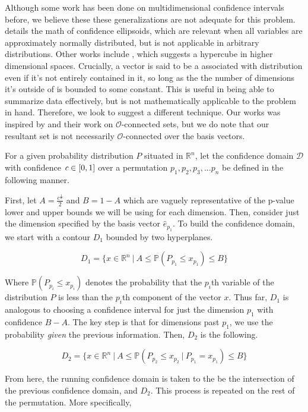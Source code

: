 \documentclass{article}
\begin{document}
    Although some work has been done on multidimensional confidence intervals before, we believe these these generalizations are not adequate for this problem. \cite{MELOUN2011667} details the math of confidence ellipsoids, which are relevant when all variables are approximately normally distributed, but is not applicable in arbitrary distributions. Other works include \cite{korpela2017multivariate}, which suggests a hypercube in higher dimensional spaces. Crucially, a vector is said to be a associated with distribution even if it's not entirely contained in it, so long as the the number of dimensions it's outside of is bounded to some constant. This is useful in being able to summarize data effectively, but is not mathematically applicable to the problem in hand. Therefore, we look to suggest a different technique. Our works was inspired by \cite{FINK1996175} and their work on $\mathcal{O}$-connected sets, but we do note that our resultant set is not necessarily $\mathcal{O}$-connected over the basis vectors.

    For a given probability distribution $P$ situated in $\mathbb{R}^n$, let the confidence domain $\mathcal{D}$ with confidence $\emph{c} \in [0,1]$ over a permutation $p_1, p_2, p_3, ... p_n$ be defined in the following manner.

    First, let $A = \frac{c ^ {\frac{1}{n}}}{2}$ and $B = 1 - A$ which are vaguely representative of the p-value lower and upper bounds we will be using for each dimension. Then, consider just the dimension specified by the basis vector $\hat{e}_{p_1}$. To build the confidence domain, we start with a contour $D_1$ bounded by two hyperplanes.

    $$D_1 = \{ x \in \mathbb{R}^n ~|~ A \le \mathbb{P}(P_{p_1} \le x_{p_1}) \le B\}$$

    Where $\mathbb{P}(P_{p_i} \le x_{p_i})$ denotes the probability that the $p_i$th variable of the distribution $P$ is less than the $p_i$th component of the vector $x$. Thus far, $D_1$ is analogous to choosing a confidence interval for just the dimension $p_1$ with confidence $B-A$. The key step is that for dimensions past $p_1$, we use the probability \emph{given} the previous information. Then, $D_2$ is the following.

    $$D_2 = \{ x \in \mathbb{R}^n ~|~ A \le \mathbb{P}(P_{p_2} \le x_{p_2} ~|~ P_{p_1} = x_{p_1}) \le B\}$$

    From here, the running confidence domain is taken to the be the intersection of the previous confidence domain, and $D_2$. This process is repeated on the rest of the permutation. More specifically,
\end{document}
